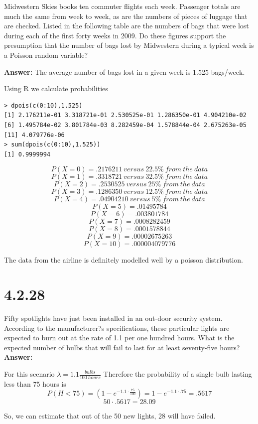 \documentclass[svgnames]{article}
\begin{document}
Midwestern Skies books ten commuter flights each week. Passenger totals are much the same from week to week, as are the numbers of pieces of luggage that are checked. Listed in the following table are the numbers of bags that were lost during each of the first forty weeks in 2009. Do these figures support the presumption that the number of bags lost by Midwestern during a typical week is a Poisson random variable?


\textbf{Answer:}
The average number of bags lost in a given week is 1.525 bags/week.

Using R we calculate probabilities
\begin{lstlisting}
> dpois(c(0:10),1.525)
[1] 2.176211e-01 3.318721e-01 2.530525e-01 1.286350e-01 4.904210e-02
[6] 1.495784e-02 3.801784e-03 8.282459e-04 1.578844e-04 2.675263e-05
[11] 4.079776e-06
> sum(dpois(c(0:10),1.525))
[1] 0.9999994
\end{lstlisting}
 $$ P(X = 0) = .2176211 \ versus\  22.5\% \ from \ the \ data$$
 $$ P(X = 1) = .3318721 \ versus\  32.5\% \ from \ the \ data$$
 $$ P(X = 2) = .2530525 \ versus\   25\% \ from \ the \ data$$
 $$ P(X = 3) = .1286350 \ versus\  12.5\% \ from \ the \ data$$
  $$ P(X = 4) = .04904210 \ versus\  5\% \ from \ the \ data$$
  $$ P(X = 5) = .01495784 $$
   $$ P(X = 6) =  .003801784$$
 $$ P(X = 7) = .0008282459 $$
  $$ P(X = 8) = .0001578844 $$
   $$ P(X = 9) = .00002675263$$
 $$ P(X = 10) =  .000004079776$$

The data from the airline is definitely modelled well by a poisson distribution.

\section{4.2.28}
Fifty spotlights have just been installed in an out-door security system. According to the manufacturer?s specifications, these particular lights are expected to burn out at the rate of 1.1 per one hundred hours. What is the expected number of bulbs that will fail to last for at least seventy-five hours?
\newline
\newline
\textbf{Answer:}

For this scenario $\lambda=1.1 \frac{bulbs}{100\ hours}$
Therefore the probability of a single bulb lasting less than 75 hours is $$P(H<75)=(1-e^{-1.1\cdot \frac{75}{100}})=1-e^{-1.1\cdot .75}=.5617$$
$$50\cdot .5617=28.09$$

So, we can estimate that out of the 50 new lights, 28 will have failed.  
\end{document}
